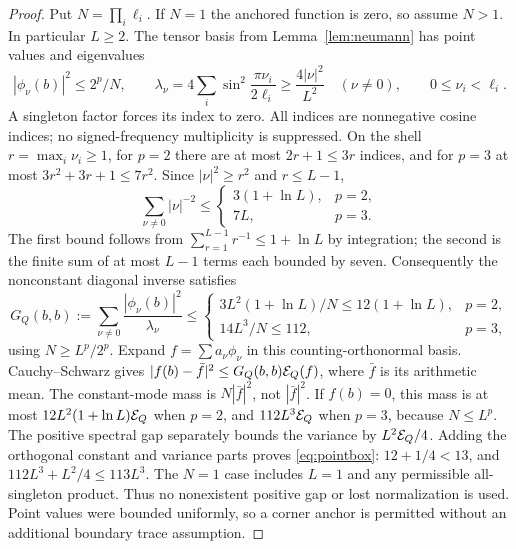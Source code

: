 \begin{proof}
Put $N=\prod_i\ell_i$. If $N=1$ the anchored function is zero, so assume
$N>1$. In particular $L\geq2$. The tensor basis from
Lemma~\ref{lem:neumann} has point values and eigenvalues
\[
 |\phi_\nu(b)|^2\leq2^p/N,\qquad
 \lambda_\nu=4\sum_i\sin^2\frac{\pi\nu_i}{2\ell_i}
       \geq\frac{4|\nu|^2}{L^2}\quad(\nu\ne0),
 \qquad0\leq\nu_i<\ell_i.
\]
A singleton factor forces its index to zero. All indices are nonnegative
cosine indices; no signed-frequency multiplicity is suppressed.
On the shell $r=\max_i\nu_i\geq1$, for $p=2$ there are at most
$2r+1\leq3r$ indices, and for $p=3$ at most
$3r^2+3r+1\leq7r^2$. Since $|\nu|^2\geq r^2$ and $r\leq L-1$,
\[
 \sum_{\nu\ne0}|\nu|^{-2}\leq
 \begin{cases}3(1+\ln L),&p=2,\\7L,&p=3.\end{cases}
\]
The first bound follows from
$\sum_{r=1}^{L-1}r^{-1}\leq1+\ln L$ by integration; the second is the
finite sum of at most $L-1$ terms each bounded by seven.
Consequently the nonconstant diagonal inverse satisfies
\begin{equation}\label{eq:finiteGreen}
 G_Q(b,b):=\sum_{\nu\ne0}\frac{|\phi_\nu(b)|^2}{\lambda_\nu}
 \leq\begin{cases}
 3L^2(1+\ln L)/N\leq12(1+\ln L),&p=2,\\
 14L^3/N\leq112,&p=3,
 \end{cases}
\end{equation}
using $N\geq L^p/2^p$.
Expand $f=\sum a_\nu\phi_\nu$ in this counting-orthonormal basis.
Cauchy--Schwarz gives
$|f(b)-\bar f|^2\leq G_Q(b,b)\mathcal E_Q(f)$, where $\bar f$ is its arithmetic
mean. The constant-mode mass is $N|\bar f|^2$, not $|\bar f|^2$.
If $f(b)=0$, this mass is at most $12L^2(1+\ln L)\mathcal E_Q$ when $p=2$,
and $112L^3\mathcal E_Q$ when $p=3$, because $N\leq L^p$.
The positive spectral gap separately bounds the variance by $L^2\mathcal E_Q/4$.
Adding the orthogonal constant and variance parts proves \eqref{eq:pointbox}:
$12+1/4<13$, and $112L^3+L^2/4\leq113L^3$.
The $N=1$ case includes $L=1$ and any permissible all-singleton product.
Thus no nonexistent positive gap or lost normalization is used. Point values
were bounded uniformly, so a corner anchor is permitted without an additional
boundary trace assumption.
\end{proof}

